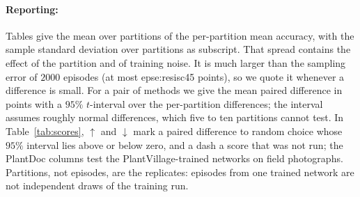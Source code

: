 \paragraph{Reporting:}
Tables give the mean over partitions of the per-partition mean accuracy, with the sample standard deviation over partitions as subscript. That spread contains the effect of the partition and of training noise. It is much larger than the sampling error of $2000$ episodes (at most \num{epse:resisc45} points), so we quote it whenever a difference is small. For a pair of methods we give the mean paired difference in points with a $95\%$ $t$-interval over the per-partition differences; the interval assumes roughly normal differences, which five to ten partitions cannot test. In Table~\ref{tab:scores}, $\uparrow$ and $\downarrow$ mark a paired difference to random choice whose $95\%$ interval lies above or below zero, and a dash a score that was not run; the PlantDoc columns test the PlantVillage-trained networks on field photographs. Partitions, not episodes, are the replicates: episodes from one trained network are not independent draws of the training run.
